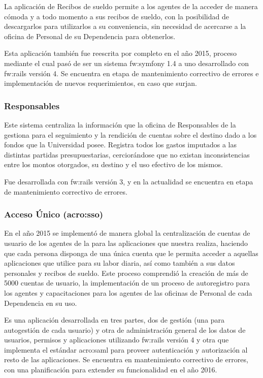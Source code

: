 La aplicación de Recibos de sueldo permite a los agentes de la {\unlp} acceder de manera cómoda y a todo momento a sus recibos de sueldo, con la posibilidad de descargarlos para utilizarlos a su conveniencia, sin necesidad de acercarse a la oficina de Personal de su Dependencia para obtenerlos.

Esta aplicación también fue reescrita por completo en el año 2015, proceso mediante el cual pasó de ser un sistema \gls{fw:symfony} 1.4 a uno desarrollado con \gls{fw:rails} versión 4. Se encuentra en etapa de mantenimiento correctivo de errores e implementación de nuevos requerimientos, en caso que surjan.


\subsubsection{Responsables}
\label{anexo:detalle-clientes:responsables}

Este sistema centraliza la información que la oficina de Responsables de la {\unlp} gestiona para el seguimiento y la rendición de cuentas sobre el destino dado a los fondos que la Universidad posee. Registra todos los gastos imputados a las distintas partidas presupuestarias, cerciorándose que no existan inconsistencias entre los montos otorgados, su destino y el uso efectivo de los mismos.

Fue desarrollada con \gls{fw:rails} versión 3, y en la actualidad se encuentra en etapa de mantenimiento correctivo de errores.


\subsubsection{Acceso Único (\gls{acro:sso})}
\label{anexo:detalle-clientes:sso}

En el año 2015 se implementó de manera global la centralización de cuentas de usuario de los agentes de la {\unlp} para las aplicaciones que nuestra {\direccionDesarrollo} realiza, haciendo que cada persona disponga de una única cuenta que le permita acceder a aquellas aplicaciones que utilice para su labor diaria, así como también a sus datos personales y recibos de sueldo. Este proceso comprendió la creación de más de 5000 cuentas de usuario, la implementación de un proceso de autoregistro para los agentes y capacitaciones para los agentes de las oficinas de Personal de cada Dependencia en su uso.

Es una aplicación desarrollada en tres partes, dos de gestión (una para autogestión de cada usuario) y otra de administración general de los datos de usuarios, permisos y aplicaciones utilizando \gls{fw:rails} versión 4 y otra que implementa el estándar \gls{acro:saml} para proveer autenticación y autorización al resto de las aplicaciones. Se encuentra en mantenimiento correctivo de errores, con una planificación para extender su funcionalidad en el año 2016.


